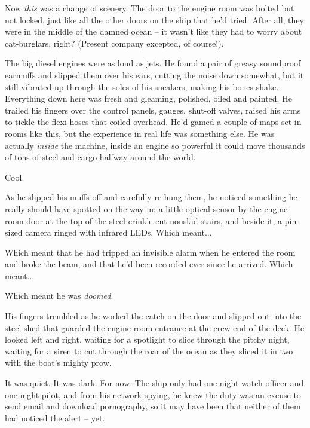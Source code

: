 Now \emph{this} was a change of scenery. The door to the engine
room was bolted but not locked, just like all the other doors on
the ship that he'd tried. After all, they were in the middle of the
damned ocean -- it wasn't like they had to worry about
cat-burglars, right? (Present company excepted, of course!).

The big diesel engines were as loud as jets. He found a pair of
greasy soundproof earmuffs and slipped them over his ears, cutting
the noise down somewhat, but it still vibrated up through the soles
of his sneakers, making his bones shake. Everything down here was
fresh and gleaming, polished, oiled and painted. He trailed his
fingers over the control panels, gauges, shut-off valves, raised
his arms to tickle the flexi-hoses that coiled overhead. He'd gamed
a couple of maps set in rooms like this, but the experience in real
life was something else. He was actually \emph{inside} the machine,
inside an engine so powerful it could move thousands of tons of
steel and cargo halfway around the world.

Cool.

As he slipped his muffs off and carefully re-hung them, he noticed
something he really should have spotted on the way in: a little
optical sensor by the engine-room door at the top of the steel
crinkle-cut nonskid stairs, and beside it, a pin-sized camera
ringed with infrared LEDs. Which meant...

Which meant that he had tripped an invisible alarm when he entered
the room and broke the beam, and that he'd been recorded ever since
he arrived. Which meant...

Which meant he was \emph{doomed}.

His fingers trembled as he worked the catch on the door and slipped
out into the steel shed that guarded the engine-room entrance at
the crew end of the deck. He looked left and right, waiting for a
spotlight to slice through the pitchy night, waiting for a siren to
cut through the roar of the ocean as they sliced it in two with the
boat's mighty prow.

It was quiet. It was dark. For now. The ship only had one night
watch-officer and one night-pilot, and from his network spying, he
knew the duty was an excuse to send email and download pornography,
so it may have been that neither of them had noticed the alert --
yet.

